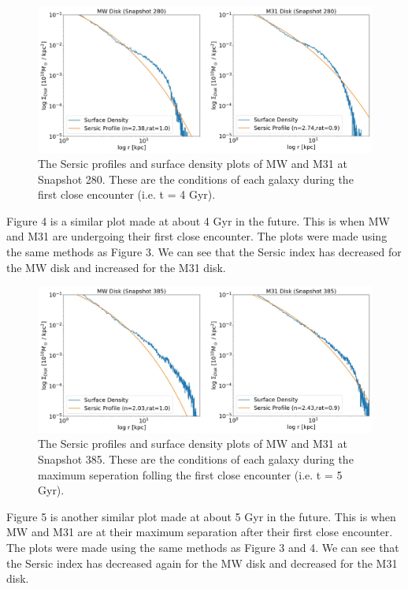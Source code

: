 \documentclass[linenumbers,trackchanges]{aastex7}
\begin{document}
\begin{figure}[h!]
\centering
\includegraphics[scale=0.35]{Results_280.jpg}
\caption{The Sersic profiles and surface density plots of MW and M31 at Snapshot 280. These are the conditions of each galaxy during the first close encounter (i.e. t = 4 Gyr).
\label{fig:general}}
\end{figure}

Figure 4 is a similar plot made at about 4 Gyr in the future. This is
when MW and M31 are undergoing their first close encounter. The plots
were made using the same methods as Figure 3. We can see that the
Sersic index has decreased for the MW disk and increased for the M31
disk.

\begin{figure}[h!]
\centering
\includegraphics[scale=0.35]{Results_385.jpg}
\caption{The Sersic profiles and surface density plots of MW and M31 at Snapshot 385. These are the conditions of each galaxy during the maximum seperation folling the first close encounter (i.e. t = 5 Gyr).
\label{fig:general}}
\end{figure}

Figure 5 is another similar plot made at about 5 Gyr in the future.
This is when MW and M31 are at their maximum separation after their
first close encounter. The plots were made using the same methods as
Figure 3 and 4. We can see that the Sersic index has decreased again
for the MW disk and decreased for the M31 disk.
\end{document}
